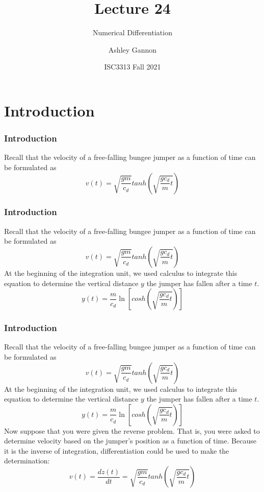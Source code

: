 \documentclass{if-beamer}
\title[Lecture 24]{Lecture 24}
\subtitle{Numerical Differentiation}
\author{Ashley Gannon}
\date{ISC3313 Fall 2021}
\begin{document}
\begin{frame}
  \titlepage
\end{frame}
\section{Introduction}

\begin{frame}[t]
\frametitle{Introduction}
Recall that the velocity of a free-falling bungee jumper as a function of time can be
formulated as
$$ v(t) = \sqrt{\frac{gm}{c_d}}tanh\left(\sqrt{\frac{gc_d}{m}t}\right) $$
\end{frame}

\begin{frame}[t]
	\frametitle{Introduction}
	Recall that the velocity of a free-falling bungee jumper as a function of time can be
	formulated as
	$$ v(t) = \sqrt{\frac{gm}{c_d}}tanh\left(\sqrt{\frac{gc_d}{m}t}\right) $$
	At the beginning of the integration unit, we used calculus to integrate this equation to determine the
	vertical distance $y$ the jumper has fallen after a time $t$.
	$$y(t) = \frac{m}{c_d}\ln\left[cosh\left( \sqrt{\frac{gc_d}{m}t} \right) \right]$$
\end{frame}

\begin{frame}[t]
	\frametitle{Introduction}
	Recall that the velocity of a free-falling bungee jumper as a function of time can be
	formulated as
	$$ v(t) = \sqrt{\frac{gm}{c_d}}tanh\left(\sqrt{\frac{gc_d}{m}t}\right) $$
	At the beginning of the integration unit, we used calculus to integrate this equation to determine the
	vertical distance $y$ the jumper has fallen after a time $t$.
	$$y(t) = \frac{m}{c_d}\ln\left[cosh\left( \sqrt{\frac{gc_d}{m}t} \right) \right]$$
	Now suppose that you were given the reverse problem. That is, you were asked to
	determine velocity based on the jumper’s position as a function of time. Because it is the inverse of integration, differentiation could be used to make the determination:
	$$v(t) = \frac{dz(t)}{dt} = \sqrt{\frac{gm}{c_d}}tanh\left(\sqrt{\frac{gc_d}{m}t}\right) $$
\end{frame}
\end{document}
